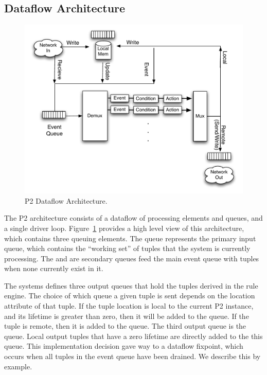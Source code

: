 \subsection{Dataflow Architecture}
\label{ch:p2:sec:dataflow}

\begin{figure} 
\ssp
\begin{center}
\includegraphics[scale=0.6]{figures/p2-arch}
\caption{\label{ch:p2:fig:dataflow}P2 Dataflow Architecture.}
\end{center} 
\end{figure}

The P2 architecture consists of a dataflow of processing elements and queues,
and a single driver loop.  Figure~\ref{ch:p2:fig:dataflow} provides a high
level view of this architecture, which contains three queuing elements.  The
 queue represents the primary input queue, which contains the
``working set'' of tuples that the system is currently processing.  The
 and  are secondary queues feed the main event queue with
tuples when none currently exist in it.

The systems defines three output queues that hold the tuples derived in the
rule engine.  The choice of which queue a given tuple is sent depends on the
location attribute of that tuple.  If the tuple location is local to the
current P2 instance, and its lifetime is greater than zero, then it will be
added to the  queue.  If the tuple is remote, then it is added to
the  queue.  The third output queue is the  queue.  Local
output tuples that have a zero lifetime are directly added to the this queue.
This implementation decision gave way to a dataflow fixpoint, which occurs when
all tuples in the event queue have been drained.  We describe this by example.


